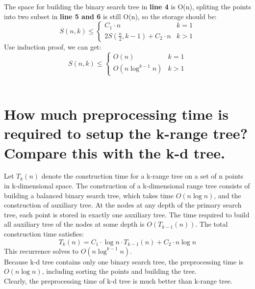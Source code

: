 \documentclass[12pt,a4paper]{report}
\begin{document}
The space for building the binary search tree in {\bf line 4} is O(n), spliting the points into two subset in {\bf line 5 and 6} is still O(n), so the storage should be: \\
\[
S(n, k) \le \left\{\begin{array}{ll}
C_{1} \cdot n & k = 1 \\
2S(\frac {n}{2}, k-1) + C_{2} \cdot n &  k > 1
\end{array} \right.
\]
Use induction proof, we can get:
\[
S(n, k) \le \left\{\begin{array}{ll}
O(n) & k = 1 \\
O(n\log^{k-1}n) &  k > 1
\end{array} \right.
\]
\\[0.5cm]
\section{How much preprocessing time is required to setup the k-range tree? Compare this with the k-d tree.}
Let $T_k(n)$ denote the construction time for a k-range tree on a set of n points in k-dimensional space. The construction of a k-dimensional range tree consists of building a balanced binary search tree, which takes time $O(n\log n)$, and the construction of auxiliary tree. At the nodes at any depth of the primary search tree, each point is stored in exactly one auxiliary tree. The time required to build all auxiliary tree of the nodes at some depth is $O(T_{k-1}(n))$. The total construction time satisfies:
$$
T_k(n) = C_{1} \cdot \log n \cdot T_{k-1}(n) + C_{2} \cdot n\log n
$$
This recurrence solves to $O(n\log^{k-1} n)$. \\[0.2cm]
Because k-d tree contains only one binary search tree, the preprocessing time is $O(n\log n)$, including sorting the points and building the tree. \\
Clearly, the preprocessing time of k-d tree is much better than k-range tree.
\\[0.5cm]
\end{document}
